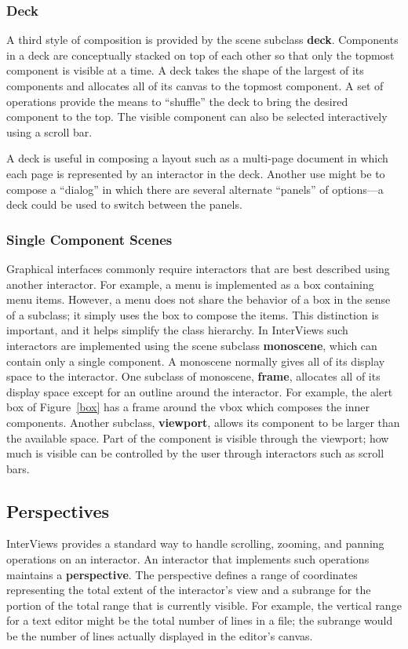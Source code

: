 \subsubsection{Deck}
A third style of composition is provided by the scene subclass {\bf deck}.
Components in a deck are conceptually stacked on top of each other so that
only the topmost component is visible at a time.  A deck takes the
shape of the largest of its components and allocates all of its canvas to
the topmost component.  A set of operations provide the means to ``shuffle''
the deck to bring the desired component to the top.  The
visible component can also be selected interactively using a scroll bar.

A deck is useful in composing a layout such as a multi-page document in which
each page is represented by an interactor in the deck.  Another
use might be to compose a ``dialog'' in which there are several alternate
``panels'' of options---a deck could be used to switch
between the panels.

\subsubsection{Single Component Scenes}
Graphical interfaces commonly require interactors that are
best described using another interactor.
For example, a menu is implemented as a box containing menu items.
However, a menu does not share the behavior of a box in the sense
of a subclass; it simply uses the box to compose the items.
This distinction is important, and it helps simplify
the class hierarchy.
In InterViews such interactors are implemented using the scene subclass
{\bf monoscene}, which can contain only a single component.
A monoscene normally gives all of its display space to the interactor.
One subclass of monoscene, {\bf frame},
allocates all of its display space except for an outline around
the interactor.  For example, the alert box of Figure~\ref{box} has a frame
around the vbox which composes the inner components.
Another subclass, {\bf viewport}, allows its component to
be larger than the available space.  Part of the component
is visible through the viewport; how much is visible can be
controlled by the user through interactors such as scroll bars.

\subsection{Perspectives}
InterViews provides a standard way to handle scrolling, zooming, and panning
operations on an interactor.
An interactor that implements such operations maintains a
{\bf perspective}. The perspective
defines a range of coordinates representing the total
extent of the interactor's view and a subrange
for the portion of the total range that is currently visible.
For example, the vertical range for a text editor might be the total number
of lines in a file; the subrange would be the number of lines
actually displayed in the editor's canvas.

